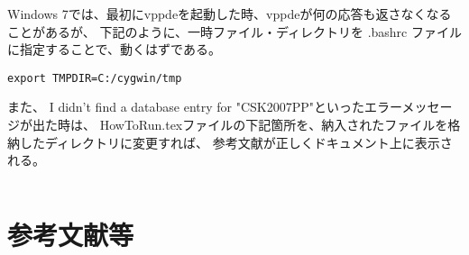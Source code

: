\documentclass[a4paper,8pt]{jsarticle}
\begin{document}
Windows 7では、最初にvppdeを起動した時、vppdeが何の応答も返さなくなることがあるが、
下記のように、一時ファイル・ディレクトリを .bashrc ファイルに指定することで、動くはずである。

\begin{verbatim}
export TMPDIR=C:/cygwin/tmp
\end{verbatim}

また、 I didn't find a database entry for "CSK2007PP"といったエラーメッセージが出た時は、
HowToRun.texファイルの下記箇所を、納入されたファイルを格納したディレクトリに変更すれば、
参考文献が正しくドキュメント上に表示される。

\begin{verbatim}

\end{verbatim}

\section{参考文献等}


%



\end{document}
